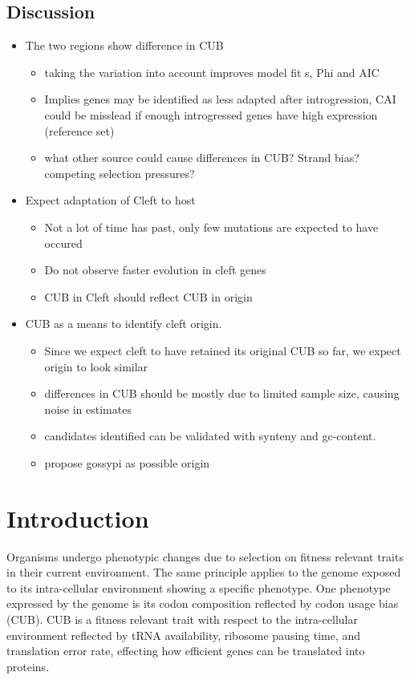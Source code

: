 \documentclass[12pt]{article}
\begin{document}
\subsection*{Discussion}
\begin{itemize}
	\item The two regions show difference in CUB
	\begin{itemize}
		\item taking the variation into account improves model fit	s, Phi and AIC
		\item Implies genes may be identified as less adapted after introgression, CAI could be misslead if enough introgressed genes have high expression (reference set)
		\item what other source could cause differences in CUB? Strand bias? competing selection pressures?
	\end{itemize}
	\item Expect adaptation of Cleft to host
	\begin{itemize}
		\item Not a lot of time has past, only few mutations are expected to have occured
		\item Do not observe faster evolution in cleft genes
		\item CUB in Cleft should reflect CUB in origin
	\end{itemize}
	\item CUB as a means to identify cleft origin.
	\begin{itemize}
		\item Since we expect cleft to have retained its original CUB so far, we expect origin to look similar
		\item differences in CUB should be mostly due to limited sample size, causing noise in estimates
		\item candidates identified can be validated with synteny and gc-content. 
		\item propose gossypi as possible origin
	\end{itemize}

\end{itemize}

\section*{Introduction}
Organisms undergo phenotypic changes due to selection on fitness relevant traits in their current environment. 
The same principle applies to the genome exposed to its intra-cellular environment showing a specific phenotype.
One phenotype expressed by the genome is its codon composition reflected by codon usage bias (CUB). 
CUB is a fitness relevant trait with respect to the intra-cellular environment reflected by tRNA availability, ribosome pausing time, and translation error rate, effecting how efficient genes can be translated into proteins. 
\end{document}
